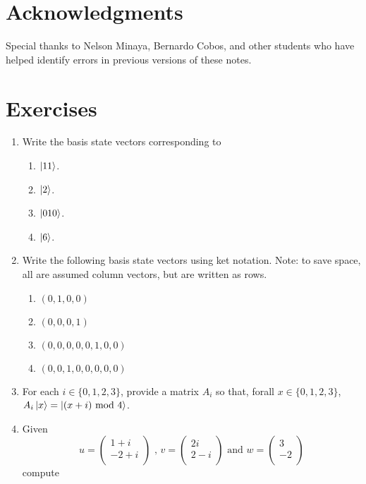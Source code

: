 \documentclass [12pt]{article}
\theoremstyle{definition}
\begin{document}
\newpage
\section*{Acknowledgments}

Special thanks to Nelson Minaya, Bernardo Cobos, and other students who have helped identify errors in previous versions of these notes.



\section*{Exercises}

\begin{enumerate}
\renewcommand{\labelenumii}{\alph{enumii}.}

\item Write the basis state vectors corresponding to 

\begin{enumerate}
\item $\ket{11}$.
\item $\ket{2}$.
\item $\ket{010}$.
\item $\ket{6}$.
\end{enumerate}

\item Write the following basis state vectors using ket notation. Note: to save space, all are assumed column vectors, but are written as rows.

\begin{enumerate}
\item $(0,1,0,0)$
\item $(0,0,0,1)$
\item $(0,0,0,0,0,1,0,0)$
\item $(0,0,1,0,0,0,0,0)$
\end{enumerate}

\item For each $i\in \{0,1,2,3\}$, provide a matrix $A_i$ so that, forall $x\in \{0,1,2,3\}$, $A_i \ket{x} = \ket{(x+i)\mbox{ mod } 4}$.

\item Given 
\[
u=\left(\begin{array}{c}
1+i \\
-2+i \\
\end{array}\right)
\mbox{ , }
v=\left(\begin{array}{c}
2i \\
2-i \\
\end{array}\right)
\mbox{ and }
w=\left(\begin{array}{c}
3 \\
-2 \\
\end{array}\right)
\]
compute


\end{enumerate}
\end{document}
